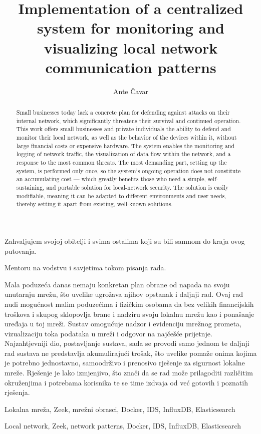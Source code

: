 \documentclass[diplomskirad]{fer}
\title{Implementation of a centralized system for monitoring and visualizing local network communication patterns}
\author{Ante Čavar}
\begin{document}
\maketitle
{}
\begin{zahvale}
  Zahvaljujem svojoj obitelji i svima ostalima koji su bili samnom do kraja ovog putovanja.

  Mentoru na vodstvu i savjetima tokom pisanja rada.
\end{zahvale}
\newpage

\begin{sazetak}
  Mala poduzeća danas nemaju konkretan plan obrane od napada na svoju unutarnju mrežu, što uvelike ugrožava njihov opstanak i daljnji rad. Ovaj rad nudi mogućnost
  malim poduzećima i fizičkim osobama da bez velikih financijskih troškova i skupog sklopovlja brane i nadziru svoju lokalnu mrežu kao i ponašanje uređaja u toj 
  mreži. Sustav omogućuje nadzor i evidenciju mrežnog prometa, vizualizaciju toka podataka u mreži i odgovor na najčešće prijetnje. Najzahtjevniji dio, postavljanje sustava, sada
  se provodi samo jednom te daljnji rad sustava ne predstavlja akumulirajući trošak, što uvelike pomaže onima kojima je potrebno jednostavno, samoodrživo i prenosivo
  rješenje za sigurnost lokalne mreže. Rješenje je lako izmjenjivo, što znači da se rad može prilagoditi različitim okruženjima i potrebama korisnika te se time izdvaja
  od već gotovih i poznatih rješenja.
\end{sazetak}
\begin{kljucnerijeci}
  Lokalna mreža, Zeek, mrežni obrasci, Docker, IDS, InfluxDB, Elasticsearch
\end{kljucnerijeci}
\begin{abstract}
  Small businesses today lack a concrete plan for defending against attacks on their internal network, which significantly threatens their survival and continued 
  operation. This work offers small businesses and private individuals the ability to defend and monitor their local network, as well as the behavior of the 
  devices within it, without large financial costs or expensive hardware. The system enables the monitoring and logging of network traffic, the visualization of 
  data flow within the network, and a response to the most common threats. The most demanding part, setting up the system, is performed only once, so the system's 
  ongoing operation does not constitute an accumulating cost — which greatly benefits those who need a simple, self-sustaining, and portable solution for local-network 
  security. The solution is easily modifiable, meaning it can be adapted to different environments and user needs, thereby setting it apart from existing, 
  well-known solutions.
\end{abstract}
\begin{keywords}
  Local network, Zeek, network patterns, Docker, IDS, InfluxDB, Elasticsearch
\end{keywords}
\end{document}
